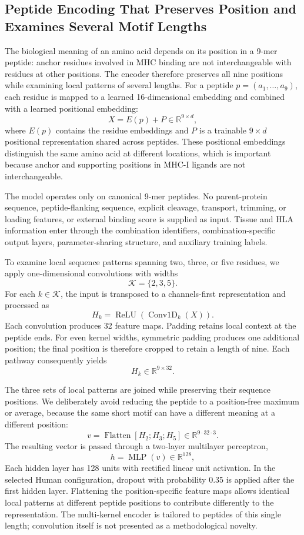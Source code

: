 \subsection{Peptide Encoding That Preserves Position and Examines Several Motif Lengths}

The biological meaning of an amino acid depends on its position in a 9-mer peptide: anchor residues involved in MHC binding are not interchangeable with residues at other positions. The encoder therefore preserves all nine positions while examining local patterns of several lengths. For a peptide \(p=(a_1,\ldots,a_9)\), each residue is mapped to a learned 16-dimensional embedding and combined with a learned positional embedding:
\[
X=E(p)+P \in \mathbb{R}^{9\times d},
\]
where \(E(p)\) contains the residue embeddings and \(P\) is a trainable \(9\times d\) positional representation shared across peptides. These positional embeddings distinguish the same amino acid at different locations, which is important because anchor and supporting positions in MHC-I ligands are not interchangeable.

The model operates only on canonical 9-mer peptides. No parent-protein sequence, peptide-flanking sequence, explicit cleavage, transport, trimming, or loading features, or external binding score is supplied as input. Tissue and HLA information enter through the combination identifiers, combination-specific output layers, parameter-sharing structure, and auxiliary training labels.

To examine local sequence patterns spanning two, three, or five residues, we apply one-dimensional convolutions with widths
\[
\mathcal{K}=\{2,3,5\}.
\]
For each \(k\in\mathcal{K}\), the input is transposed to a channels-first representation and processed as
\[
H_k
=
\operatorname{ReLU}
\left(
\operatorname{Conv1D}_{k}(X)
\right).
\]
Each convolution produces 32 feature maps. Padding retains local context at the peptide ends. For even kernel widths, symmetric padding produces one additional position; the final position is therefore cropped to retain a length of nine. Each pathway consequently yields
\[
H_k\in\mathbb{R}^{9\times 32}.
\]

The three sets of local patterns are joined while preserving their sequence positions. We deliberately avoid reducing the peptide to a position-free maximum or average, because the same short motif can have a different meaning at a different position:
\[
v
=
\operatorname{Flatten}
\left[
H_2;H_3;H_5
\right]
\in\mathbb{R}^{9\cdot32\cdot3}.
\]
The resulting vector is passed through a two-layer multilayer perceptron,
\[
h
=
\operatorname{MLP}(v)
\in\mathbb{R}^{128},
\]
Each hidden layer has 128 units with rectified linear unit activation. In the selected Human configuration, dropout with probability 0.35 is applied after the first hidden layer. Flattening the position-specific feature maps allows identical local patterns at different peptide positions to contribute differently to the representation. The multi-kernel encoder is tailored to peptides of this single length; convolution itself is not presented as a methodological novelty.

